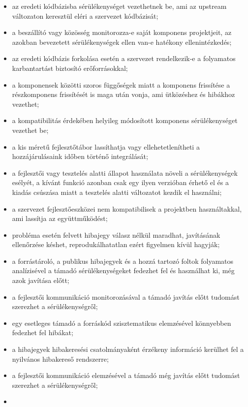 \documentclass[12pt,magyar,a4paper,oneside]{scrreprt}
\providecommand{\tightlist}{%
  \setlength{\itemsep}{0pt}\setlength{\parskip}{0pt}}
\begin{document}
\begin{itemize}
\tightlist
\item
  az eredeti kódbázisba sérülékenységet vezethetnek be, ami az upstream
  változaton keresztül eléri a szervezet kódbázisát;
\item
  a beszállító vagy közösség monitorozza-e saját komponens projektjeit,
  az azokban bevezetett sérülékenységek ellen van-e hatékony
  ellenintézkedés;
\item
  az eredeti kódbázis forkolása esetén a szervezet rendelkezik-e a
  folyamatos karbantartást biztosító erőforrásokkal;
\item
  a komponensek közötti szoros függőségek miatt a komponens frissítése a
  részkomponens frissítését is maga után vonja, ami ütközéshez és
  hibákhoz vezethet;
\item
  a kompatibilitás érdekében helyileg módosított komponens
  sérülékenységet vezethet be;
\item
  a kis méretű fejlesztőtábor lassíthatja vagy ellehetetlenítheti a
  hozzájárulásaink időben történő integrálását;
\item
  a fejlesztői vagy tesztelés alatti állapot használata növeli a
  sérülékenységek esélyét, a kívánt funkció azonban csak egy ilyen
  verzióban érhető el és a kiadás csúszása miatt a tesztelés alatti
  változatot kezdik el használni;
\item
  a szervezet fejlesztőeszközei nem kompatibilisek a projektben
  használtakkal, ami lassítja az együttműködést;
\item
  probléma esetén felvett hibajegy válasz nélkül maradhat, javításának
  ellenőrzése késhet, reprodukálhatatlan ezért figyelmen kívül hagyják;
\item
  a forrástároló, a publikus hibajegyek és a hozzá tartozó foltok
  folyamatos analízisével a támadó sérülékenységeket fedezhet fel és
  használhat ki, még azok javítása előtt;
\item
  a fejlesztői kommunikáció monitorozásával a támadó javítás előtt
  tudomást szerezhet a sérülékenységről;
\item
  egy esetleges támadó a forráskód szisztematikus elemzésével könnyebben
  fedezhet fel hibákat;
\item
  a hibajegyek hibakeresési csatolmányaként érzékeny információ kerülhet
  fel a nyilvános hibakereső rendszerre;
\item
  a fejlesztői kommunikáció elemzésével a támadó még javítás előtt
  tudomást szerezhet a sérülékenységről;
\item

\end{itemize}
\end{document}
